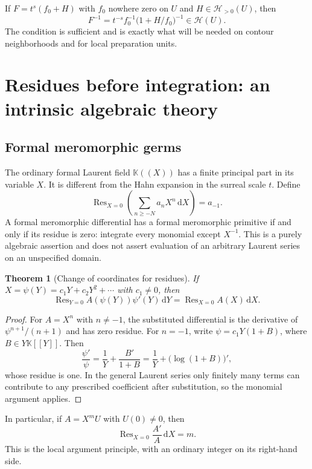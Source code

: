 \documentclass[11pt,oneside]{article}
\numberwithin{equation}{section}
\newtheorem{theorem}{Theorem}[section]
\theoremstyle{definition}
\theoremstyle{remark}\newtheorem{remark}[theorem]{Remark}
\newcommand{\K}{\mathbb K}
\newcommand{\HH}{\mathscr H}
\newcommand{\Res}{\operatorname{Res}}
\newcommand{\dd}{\,\mathrm d}
\begin{document}
If $F=t^s(f_0+H)$ with $f_0$ nowhere zero on $U$ and $H\in\HH_{>0}(U)$,
then
\[
 F^{-1}=t^{-s}f_0^{-1}\bigl(1+H/f_0\bigr)^{-1}\in\HH(U).
\]
The condition is sufficient and is exactly what will be needed on
contour neighborhoods and for local preparation units.

\section{Residues before integration: an intrinsic algebraic theory}
\subsection{Formal meromorphic germs}
The ordinary formal Laurent field $\K((X))$ has a finite principal part
in its variable $X$. It is different from the Hahn expansion in the
surreal scale $t$. Define
\[
 \Res_{X=0}\left(\sum_{n\geq-N}a_nX^n\dd X\right)=a_{-1}.
\]
A formal meromorphic differential has a formal meromorphic primitive if
and only if its residue is zero: integrate every monomial except $X^{-1}$.
This is a purely algebraic assertion and does not assert evaluation of an
arbitrary Laurent series on an unspecified domain.

\begin{theorem}[Change of coordinates for residues]\label{thm:reschange}
If $X=\psi(Y)=c_1Y+c_2Y^2+\cdots$ with $c_1\ne0$, then
\[
 \Res_{Y=0} A(\psi(Y))\psi'(Y)\dd Y
   =\Res_{X=0} A(X)\dd X.
\]
\end{theorem}
\begin{proof}
For $A=X^n$ with $n\ne-1$, the substituted differential is the derivative
of $\psi^{n+1}/(n+1)$ and has zero residue. For $n=-1$, write
$\psi=c_1Y(1+B)$, where $B\in Y\K[[Y]]$. Then
\[
 \frac{\psi'}\psi=\frac1Y+\frac{B'}{1+B}
 =\frac1Y+\bigl(\log(1+B)\bigr)',
\]
whose residue is one. In the general Laurent series only finitely many
terms can contribute to any prescribed coefficient after substitution,
so the monomial argument applies.
\end{proof}
In particular, if $A=X^mU$ with $U(0)\ne0$, then
\begin{equation}\label{eq:localarg}
 \Res_{X=0}\frac{A'}A\dd X=m.
\end{equation}
This is the local argument principle, with an ordinary integer on its
right-hand side.
\end{document}
